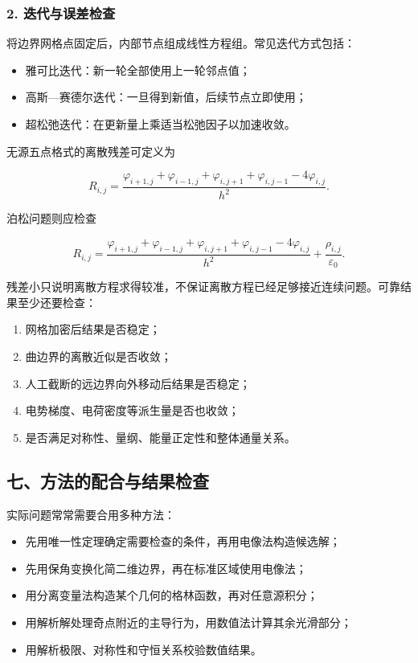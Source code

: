 \subsubsection{2.
迭代与误差检查}\label{m2:ux8fedux4ee3ux4e0eux8befux5deeux68c0ux67e5}

将边界网格点固定后，内部节点组成线性方程组。常见迭代方式包括：

\begin{itemize}
\tightlist
\item
  雅可比迭代：新一轮全部使用上一轮邻点值；
\item
  高斯---赛德尔迭代：一旦得到新值，后续节点立即使用；
\item
  超松弛迭代：在更新量上乘适当松弛因子以加速收敛。
\end{itemize}

无源五点格式的离散残差可定义为

\[
R_{i,j}
=\frac{
\varphi_{i+1,j}+\varphi_{i-1,j}
+\varphi_{i,j+1}+\varphi_{i,j-1}
-4\varphi_{i,j}
}{h^2}.
\]

泊松问题则应检查

\[
R_{i,j}
=\frac{
\varphi_{i+1,j}+\varphi_{i-1,j}
+\varphi_{i,j+1}+\varphi_{i,j-1}
-4\varphi_{i,j}
}{h^2}
+\frac{\rho_{i,j}}{\varepsilon_0}.
\]

残差小只说明离散方程求得较准，不保证离散方程已经足够接近连续问题。可靠结果至少还要检查：

\begin{enumerate}
\def\labelenumi{\arabic{enumi}.}
\tightlist
\item
  网格加密后结果是否稳定；
\item
  曲边界的离散近似是否收敛；
\item
  人工截断的远边界向外移动后结果是否稳定；
\item
  电势梯度、电荷密度等派生量是否也收敛；
\item
  是否满足对称性、量纲、能量正定性和整体通量关系。
\end{enumerate}

\subsection{七、方法的配合与结果检查}\label{m2:ux4e03ux65b9ux6cd5ux7684ux914dux5408ux4e0eux7ed3ux679cux68c0ux67e5}

实际问题常常需要合用多种方法：

\begin{itemize}
\tightlist
\item
  先用唯一性定理确定需要检查的条件，再用电像法构造候选解；
\item
  先用保角变换化简二维边界，再在标准区域使用电像法；
\item
  用分离变量法构造某个几何的格林函数，再对任意源积分；
\item
  用解析解处理奇点附近的主导行为，用数值法计算其余光滑部分；
\item
  用解析极限、对称性和守恒关系校验数值结果。
\end{itemize}


